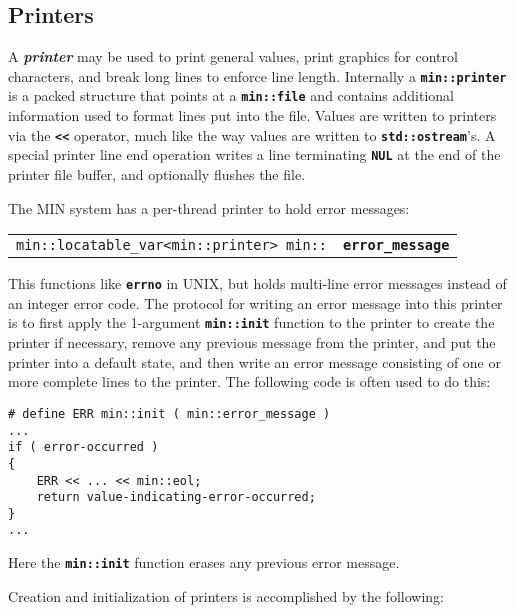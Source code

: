\documentclass[12pt]{article}
\makeatletter
\newcommand{\TT}[1]{{\tt \bfseries #1}}
\newcommand{\key}[1]{{\bf \em #1}\index{#1}}
\newcommand{\ttindex}[1]{\index{#1@{\tt #1}}}
\newcommand{\EOL}{\penalty \exhyphenpenalty}
\newenvironment{indpar}[1][0.3in]%
	{\begin{list}{}%
		     {\setlength{\itemsep}{0in}%
		      \setlength{\topsep}{0in}%
		      \setlength{\parsep}{1ex}%
		      \setlength{\labelwidth}{#1}%
		      \setlength{\leftmargin}{#1}%
		      \addtolength{\leftmargin}{\labelsep}}%
	 \item}%
	{\end{list}}
\newcommand{\LABEL}[1]{\label{#1}}
\newcommand{\MINKEY}[1]%
	   {\TT{#1}\ttindex{min::#1}\ttindex{#1}}
\makeatother
\begin{document}
\subsection{Printers}
\label{PRINTERS}

A \key{printer} may be used to print general values, print graphics for
control characters, and break long lines to enforce line length.
Internally a \TT{min::\EOL printer} is
a packed structure that points at a \TT{min::\EOL file} and contains
additional information used to format lines put into the file.
Values are written to printers via the \TT{<{}<} operator, much like the
way values are written to \TT{std::\EOL ostream}'s.  A special
printer line end operation writes a line terminating \TT{NUL}
at the end of the printer file buffer, and optionally flushes the file.

The MIN system has a per-thread printer to hold error messages:
\begin{indpar}[1em]\begin{tabular}{r@{}l}
\verb|min::locatable_var<min::printer> min::| & \MINKEY{error\_\EOL message}
\LABEL{MIN::ERROR_MESSAGE}%
\label{ERROR_MESSAGE} \\
\end{tabular}\end{indpar}

This functions like \TT{errno} in UNIX, but
holds multi-line error messages instead of an integer error
code.  The protocol for writing
an error message into this printer is to first apply
the 1-argument \TT{min::init} function to the printer to create the printer
if necessary, remove any previous message from the printer,
and put the printer into a default state,
and then write an error message consisting of one or more
complete lines to the printer.  The following code is often
used to do this:\label{ERROR_MESSAGE_EXAMPLE}
\begin{indpar}\begin{verbatim}
# define ERR min::init ( min::error_message )
...
if ( error-occurred )
{
    ERR << ... << min::eol;
    return value-indicating-error-occurred;
}
...
\end{verbatim}\end{indpar}

Here the \TT{min::init} function erases any previous error
message.

Creation and initialization of printers is
accomplished by the following:
\end{document}
